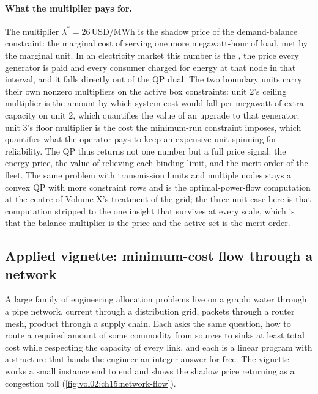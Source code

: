 \paragraph{What the multiplier pays for.}
The multiplier $\lambda^{*} = 26\,\text{USD/MWh}$ is the shadow price
of the demand-balance constraint: the marginal cost of serving one more
megawatt-hour of load, met by the marginal unit. In an electricity
market this number is the , the
price every generator is paid and every consumer charged for energy at
that node in that interval, and it falls directly out of the QP dual.
The two boundary units carry their own nonzero multipliers on the
active box constraints: unit 2's ceiling multiplier is the amount by
which system cost would fall per megawatt of extra capacity on unit 2,
which quantifies the value of an upgrade to that generator; unit 3's
floor multiplier is the cost the minimum-run constraint imposes, which
quantifies what the operator pays to keep an expensive unit spinning
for reliability. The QP thus returns not one number but a full price
signal: the energy price, the value of relieving each binding limit,
and the merit order of the fleet. The same problem with transmission
limits and multiple nodes stays a convex QP with more constraint rows
and is the optimal-power-flow computation at the centre of Volume X's
treatment of the grid; the three-unit case here is that computation
stripped to the one insight that survives at every scale, which is that
the balance multiplier is the price and the active set is the merit
order.

\subsection{Applied vignette: minimum-cost flow through a network}

A large family of engineering allocation problems live on a graph:
water through a pipe network, current through a distribution grid,
packets through a router mesh, product through a supply chain. Each asks
the same question, how to route a required amount of some commodity from
sources to sinks at least total cost while respecting the capacity of
every link, and each is a linear program with a structure that hands the
engineer an integer answer for free. The vignette works a small
instance end to end and shows the shadow price returning as a congestion
toll (\cref{fig:vol02:ch15:network-flow}).



